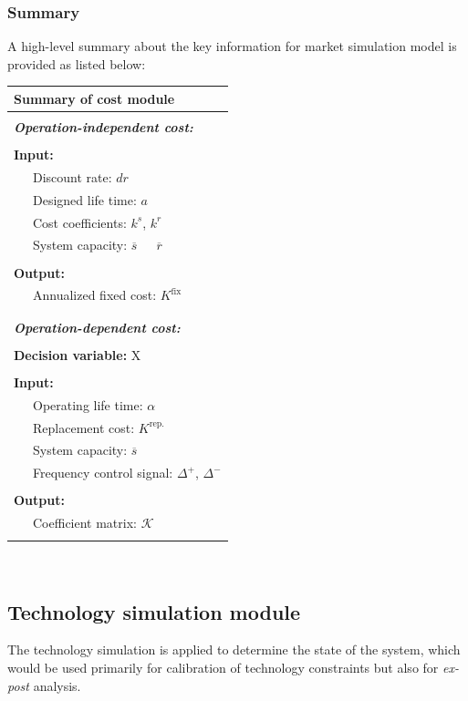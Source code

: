 \subsubsection{Summary}
A high-level summary about the key information for market simulation model is provided as listed below:
\begin{table}[h!]
	\begin{tabular}{L{0.95\textwidth}}
		\hline
		\textbf{Summary of cost module} \\
		\hline
		\\
		\textit{\textbf{Operation-independent cost:}}\\
		\\
		\textbf{Input:} \\
		~~~Discount rate: $dr$ \\
		~~~Designed life time: $a$\\
		~~~Cost coefficients: $k^s$, $k^r$ \\
		~~~System capacity: $\overline{s}$~~~$\overline{r}$ \\		
		\\
		\textbf{Output:} \\
		~~~Annualized fixed cost:  $K^{\text{fix}}$  \\
		\\
		\hline
		\\
		\textit{\textbf{Operation-dependent cost:}}\\
		\\
		\textbf{Decision variable:} X\\
		\\
		\textbf{Input:} \\
		~~~Operating life time: $\alpha$\\
		~~~Replacement cost: $K^{\text{rep.}}$\\
		~~~System capacity: $\overline{s}$\\
		~~~Frequency control signal: $\Delta^+$, $\Delta^-$\\
		\\
		\textbf{Output:} \\
		~~~Coefficient matrix: $\mathcal{K}$ \\
		\\
		\hline
	\end{tabular}
\end{table}
~\newpage
\subsection{Technology simulation module}
\label{sec:tech-simulation-module}
The technology simulation is applied to determine the state of the system, which would be used primarily for calibration of technology constraints but also for \textit{ex-post} analysis.

